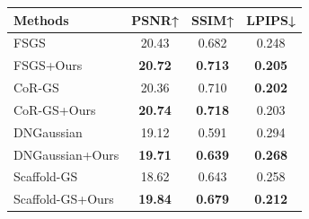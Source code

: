 \begin{tabular}{l|ccc}
\toprule
 Methods     & PSNR↑ & SSIM↑ & LPIPS↓ \\
\midrule
FSGS~\cite{zhu2024fsgs}  & 20.43 & 0.682 & 0.248 \\
FSGS+Ours & \textbf{20.72} & \textbf{0.713} & \textbf{0.205} \\
\midrule
CoR-GS~\cite{zhang2024corgs} & 20.36 & 0.710 & \textbf{0.202} \\
CoR-GS+Ours & \textbf{20.74} & \textbf{0.718} & 0.203 \\
\midrule
DNGaussian~\cite{li2024dngaussian} & 19.12 & 0.591 & 0.294 \\
DNGaussian+Ours & \textbf{19.71} & \textbf{0.639} & \textbf{0.268} \\
\midrule
Scaffold-GS~\cite{lu2024scaffold} & 18.62 & 0.643 & 0.258 \\
Scaffold-GS+Ours & \textbf{19.84} & \textbf{0.679} & \textbf{0.212} \\
\bottomrule
\end{tabular}%
